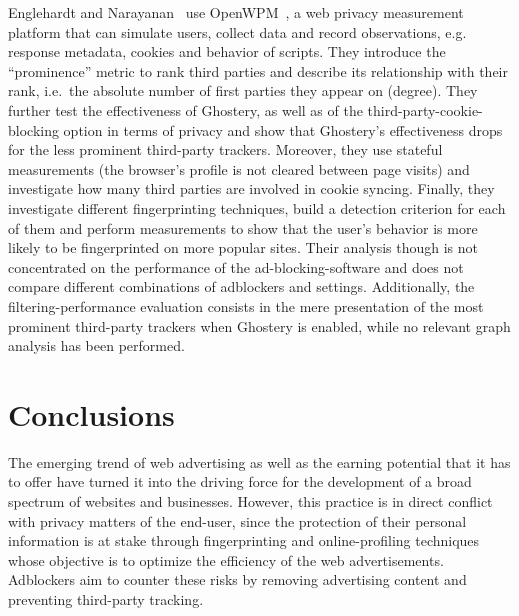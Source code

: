 \documentclass[compsoc, conference, letterpaper, 10pt, times]{IEEEtran}
\begin{document}
Englehardt and Narayanan~\cite{englehardt} use OpenWPM~\cite{englehardt_open_wpm}, a web privacy measurement platform that can simulate users, collect data and record observations, e.g. response metadata, cookies and behavior of scripts. They introduce the ``prominence'' metric to rank third parties
and describe its relationship with their rank, i.e.\ the absolute number of first parties they appear on (degree). They further test the effectiveness of Ghostery, as well as of the third-party-cookie-blocking option in terms of privacy and show that Ghostery's effectiveness drops for the less prominent third-party trackers. Moreover, they use stateful measurements (the browser's profile is not cleared between page visits) and investigate how many third parties are involved in cookie syncing.
Finally, they investigate different fingerprinting techniques, build a detection criterion for each of them and perform measurements to show that the user's behavior is more likely to be fingerprinted on more popular sites.
Their analysis though is not concentrated on the performance of the ad-blocking-software and does not compare different combinations of adblockers and settings. Additionally, the filtering-performance evaluation consists in the mere presentation of the most prominent third-party trackers when Ghostery is enabled, while no relevant graph analysis has been performed.


\section{Conclusions} \label{sec:conclusions}

The emerging trend of web advertising as well as the earning potential that it has to offer have turned it into the driving force for the development of a broad spectrum of websites and businesses. However, this practice is in direct conflict with privacy matters of the end-user, since the protection of their personal information is at stake through fingerprinting and online-profiling techniques whose objective is to optimize the efficiency of the web advertisements.
Adblockers aim to counter these risks by removing advertising content and preventing third-party tracking.
\end{document}
